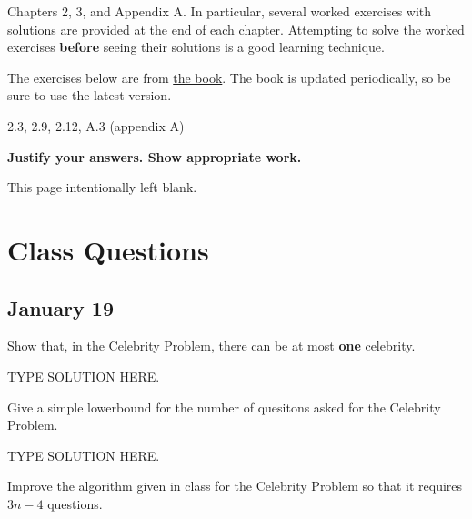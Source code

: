 \documentclass[final]{article}
\begin{document}
\begin{titlepage}
    \begin{tcolorbox}[title=Reading,fonttitle=\bfseries]
        Chapters 2, 3, and Appendix A. In particular, several worked exercises with solutions are provided at the end of each chapter. Attempting to solve the worked exercises \textbf{before} seeing their solutions is a good learning technique.
    \end{tcolorbox}
    The exercises below are from \href{https://sites.google.com/site/gopalpandurangan/home/algorithms-course}{the book}. The book is updated periodically, so be sure to use the latest version.

    \begin{tcolorbox}[title=Exercises,fonttitle=\bfseries]
        2.3, 2.9, 2.12, A.3 (appendix A)
    \end{tcolorbox}

    \textbf{Justify your answers. Show appropriate work.}
\end{titlepage}
\vspace*{\fill}\begin{center}{\Huge This page intentionally left blank.}\end{center}\vspace*{\fill}\thispagestyle{empty}\clearpage
{}

\section{Class Questions}
\subsection{January 19}

\begin{question}
    Show that, in the Celebrity Problem, there can be at most \textbf{one} celebrity.
\end{question}

\begin{solution}
    TYPE SOLUTION HERE.
\end{solution}

\begin{question}
    Give a simple lowerbound for the number of quesitons asked for the Celebrity Problem.
\end{question}

\begin{solution}
    TYPE SOLUTION HERE.
\end{solution}

\begin{question}
    Improve the algorithm given in class for the Celebrity Problem so that it requires $3n - 4$ questions.
\end{question}
\end{document}

